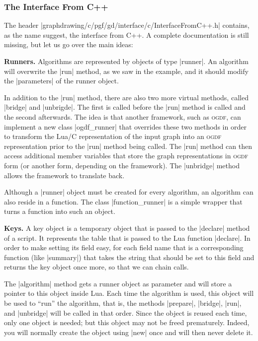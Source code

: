 \subsubsection{The Interface From C++}

The header |graphdrawing/c/pgf/gd/interface/c/InterfaceFromC++.h|
contains, as the name suggest, the interface from C++. A complete
documentation is still missing, but let us go over the main ideas:

\medskip
\noindent\textbf{Runners.}
Algorithms are represented by objects of type |runner|. An
algorithm will overwrite the |run| method, as we saw in the
example, and it should modify the |parameters| of the runner
object. 

In addition to the |run| method, there are also two more virtual
methods, called |bridge| and |unbrigde|. The first is called before
the |run| method is called and the second afterwards. The idea is that
another framework, such as \textsc{ogdf}, can implement a new class
|ogdf_runner| that overrides these two methods in order to transform
the Lua/C representation of the input graph into an \textsc{ogdf}
representation prior to the |run| method being called. The |run|
method can then access additional member variables that store the
graph representations in \textsc{ogdf} form (or another form,
depending on the framework). The |unbridge| method allows the
framework to translate back.

Although a |runner| object must be created for every algorithm, an
algorithm can also reside in a function. The class |function_runner|
is a simple wrapper that turns a function into such an object.


\medskip
\noindent\textbf{Keys.}
A key object is a temporary object that is passed to the |declare|
method of a script. It represents the table that is passed to the Lua
function |declare|. In order to make setting its field easy, for each
field name that is a corresponding function (like |summary|) that
takes the string that should be set to this field and returns the key
object once more, so that we can chain calls.

The |algorithm| method gets a runner object as parameter and will
store a pointer to this object inside Lua. Each time the algorithm is
used, this object will be used to ``run'' the algorithm, that is, the
methods |prepare|, |bridge|, |run|, and |unbridge| will be called in
that order. Since the object is reused each time, only one object is
needed; but this object may not be freed prematurely. Indeed, you will
normally create the object using |new| once and will then never delete
it.

